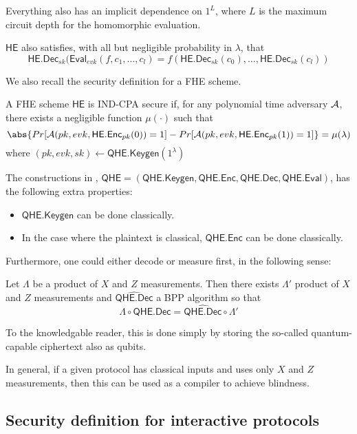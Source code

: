 Everything also has an implicit dependence on $1^L$, where $L$ is the maximum circuit depth for the homomorphic evaluation.

$\mathsf{HE}$ also satisfies, with all but negligible probability in $\lambda$, that
$$\mathsf{HE.Dec}_{sk}(\mathsf{Eval}_{evk}(f, c_1, \ldots, c_l)=f(\mathsf{HE.Dec}_{sk}(c_0),\ldots,\mathsf{HE.Dec}_{sk}(c_l))$$

We also recall the security definition for a FHE scheme.

\begin{dfn}
	A FHE scheme $\mathsf{HE}$ is IND-CPA secure if, for any polynomial time adversary $\mathcal{A}$, there exists a negligible function $\mu(\cdot)$ such that
	$$\abs{Pr[\cA(pk, evk, \mathsf{HE.Enc}_{pk}(0))=1]-Pr[\cA(pk, evk, \mathsf{HE.Enc}_{pk}(1))=1]}=\mu(\lambda)$$
	where $(pk, evk, sk)\leftarrow\mathsf{QHE.Keygen}(1^\lambda)$
\end{dfn}

The constructions in \cite{mahadev_qfhe}, $\mathsf{QHE}=(\mathsf{QHE.Keygen}, \mathsf{QHE.Enc}, \mathsf{QHE.Dec}, \mathsf{QHE.Eval})$, has the following extra properties:
\begin{itemize}
	\item $\mathsf{QHE.Keygen}$ can be done classically.
	\item In the case where the plaintext is classical, $\mathsf{QHE.Enc}$ can be done classically.
\end{itemize}

Furthermore, one could either decode or measure first, in the following sense:
\begin{lemma}
	\label{decodeMeasureOrder}
	Let $\Lambda$ be a product of $X$ and $Z$ measurements. Then there exists $\Lambda'$ product of $X$ and $Z$ measurements and $\widehat{\mathsf{QHE.Dec}}$ a BPP algorithm so that
		$$\Lambda\circ\mathsf{QHE.Dec}=\widehat{\mathsf{QHE.Dec}}\circ\Lambda'$$
\end{lemma}
To the knowledgable reader, this is done simply by storing the so-called quantum-capable ciphertext also as qubits.

In general, if a given protocol has classical inputs and uses only $X$ and $Z$ measurements, then this can be used as a compiler to achieve blindness.

\subsection{Security definition for interactive protocols}

